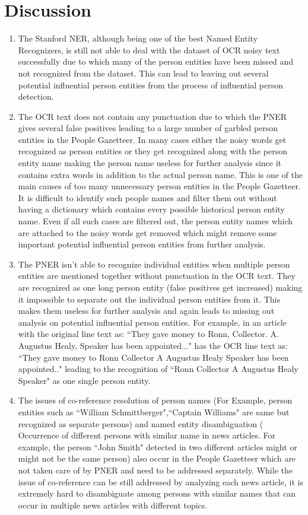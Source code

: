 \section{Discussion}
\label{gaz:discussion}
\begin{enumerate}
\item The Stanford NER, although being one of the best Named Entity Recognizers, is still not able to deal with the dataset of OCR noisy text successfully due to which many of the person entities have been missed and not recognized from the dataset. This can lead to leaving out several potential influential person entities from the process of influential person detection.

\item The OCR text does not contain any punctuation due to which the PNER gives several false positives leading to a large number of garbled person entities in the People Gazetteer. In many cases either the noisy words get recognized as person entities or they get recognized along with the person entity name making the person name useless for further analysis since it contains extra words in addition to the actual person name. This is one of the main causes of too many unnecessary person entities in the People Gazetteer. It is difficult to identify such people names and filter them out without having a dictionary which contains every possible historical person entity name. Even if all such cases are filtered out, the person entity names which are attached to the noisy words get removed which might remove some important potential influential person entities from further analysis.

\item 
The PNER isn't able to recognize individual entities when multiple person entities are mentioned together without punctuation in the OCR text. They are recognized as one long person entity (false positives get increased) making it impossible to separate out the individual person entities from it. This makes them useless for further analysis and again leads to missing out analysis on potential influential person entities.
For example, in an article with the original line text as: ``They gave money to Ronn, Collector. A. Augustus Healy, Speaker has been appointed..." has the OCR line text as: ``They gave money to Ronn Collector A Augustus Healy Speaker has been appointed.." leading to the recognition of ``Ronn Collector A Augustus Healy Speaker" as one single person entity.

\item
The issues of co-reference resolution of person names (For Example, person entities such as ``William Schmittberger",``Captain Williams" are same but recognized as separate persons) and named entity disambiguation ( Occurrence of different persons with similar name in news articles. For example, the person ``John Smith" detected in two different articles might or might not be the same person) also occur in the People Gazetteer which are not taken care of by PNER and need to be addressed separately. While the issue of co-reference can be still addressed by analyzing each news article, it is extremely hard to disambiguate among persons with similar names that can occur in multiple news articles with different topics.  



\end{enumerate}
